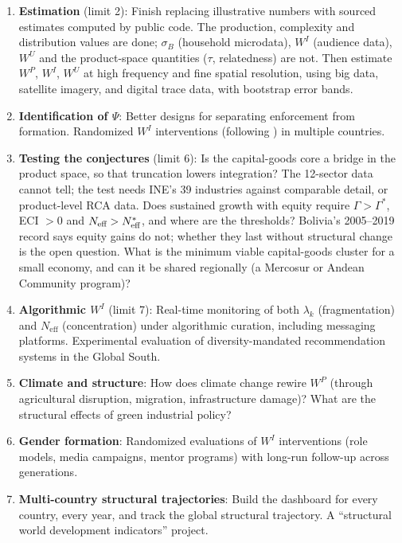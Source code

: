 \documentclass[../structural_economics_book.tex]{subfiles}
\begin{document}
\begin{enumerate}
\item \textbf{Estimation} (limit 2): Finish replacing illustrative numbers with sourced estimates computed by public code. The production, complexity and distribution values are done; $\sigma_B$ (household microdata), $W^I$ (audience data), $W^U$ and the product-space quantities ($\tau$, relatedness) are not. Then estimate $W^P$, $W^I$, $W^U$ at high frequency and fine spatial resolution, using big data, satellite imagery, and digital trace data, with bootstrap error bands.

\item \textbf{Identification of $\Psi$}: Better designs for separating enforcement from formation. Randomized $W^I$ interventions (following \citealp{bernard2014future}) in multiple countries.

\item \textbf{Testing the conjectures} (limit 6): Is the capital-goods core a bridge in the product space, so that truncation lowers integration? The 12-sector data cannot tell; the test needs INE's 39 industries against comparable detail, or product-level RCA data. Does sustained growth with equity require $\Gamma > \Gamma^*$, ECI $> 0$ and $N_{\text{eff}} > N^*_{\text{eff}}$, and where are the thresholds? Bolivia's 2005--2019 record says equity gains do not; whether they last without structural change is the open question. What is the minimum viable capital-goods cluster for a small economy, and can it be shared regionally (a Mercosur or Andean Community program)?

\item \textbf{Algorithmic $W^I$} (limit 7): Real-time monitoring of both $\lambda_k$ (fragmentation) and $N_{\text{eff}}$ (concentration) under algorithmic curation, including messaging platforms. Experimental evaluation of diversity-mandated recommendation systems in the Global South.

\item \textbf{Climate and structure}: How does climate change rewire $W^P$ (through agricultural disruption, migration, infrastructure damage)? What are the structural effects of green industrial policy?

\item \textbf{Gender formation}: Randomized evaluations of $W^I$ interventions (role models, media campaigns, mentor programs) with long-run follow-up across generations.

\item \textbf{Multi-country structural trajectories}: Build the dashboard for every country, every year, and track the global structural trajectory. A ``structural world development indicators'' project.


\end{enumerate}
\end{document}
